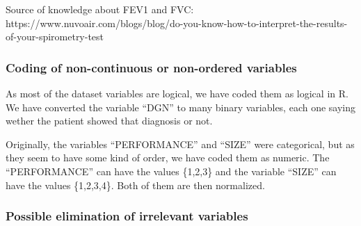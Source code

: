 Source of knowledge about FEV1 and FVC:
https://www.nuvoair.com/blogs/blog/do-you-know-how-to-interpret-the-results-of-your-spirometry-test






\subsubsection{Coding of non-continuous or non-ordered variables}

%
%
%

As most of the dataset variables are logical, we have coded them as logical in R. We have converted the variable ``DGN'' to many binary variables, each one saying wether the patient showed that diagnosis or not.

Originally, the variables ``PERFORMANCE'' and ``SIZE'' were categorical, but as they seem to have some kind of order, we have coded them as numeric. The ``PERFORMANCE'' can have the values \{1,2,3\} and the variable ``SIZE'' can have the values \{1,2,3,4\}. Both of them are then normalized.

\subsubsection{Possible elimination of irrelevant variables}\label{sec-elim-var}

